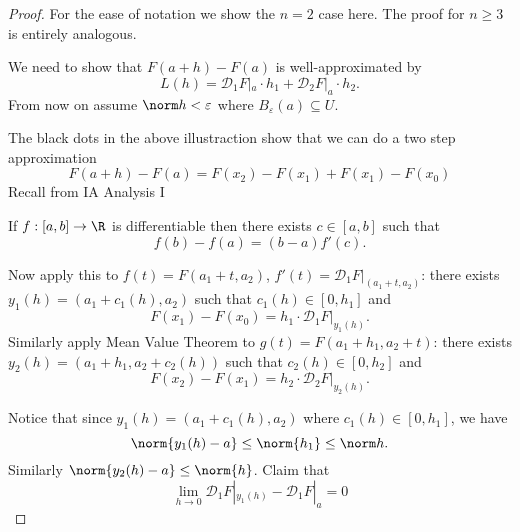 \documentclass[a4paper]{article}
\newcommand*{\D}{\mathcal{D}}
\theoremstyle{definition}
\begin{document}
\begin{proof}
  \label{proof:C1 implies differentiability}
  For the ease of notation we show the \(n = 2\) case here. The proof for \(n \geq 3\) is entirely analogous.

  We need to show that \(F(a + h) - F(a)\) is well-approximated by
  \[
    L(h) = \D_1 F|_a \cdot h_1 + \D_2 F|_a \cdot h_2.
  \]
  From now on assume \(\norm h < \varepsilon\) where \(B_\varepsilon(a) \subseteq U\).

  \begin{center}
  \end{center}
  The black dots in the above illustraction show that we can do a two step approximation
  \[
    F(a + h) - F(a) = F(x_2) - F(x_1) + F(x_1) - F(x_0)
  \]
  Recall from IA Analysis I
  
  \begin{theorem}
    If \(f: [a, b] \to \R\) is differentiable then there exists \(c \in [a, b]\) such that
    \[
      f(b) - f(a) = (b - a) f'(c).
    \]
  \end{theorem}

  Now apply this to \(f(t) = F(a_1 + t, a_2)\), \(f'(t) = \D_1 F|_{(a_1 + t, a_2)}\): there exists \(y_1(h) = (a_1 + c_1(h), a_2)\) such that \(c_1(h) \in [0, h_1]\) and
  \[
    F(x_1) - F(x_0) = h_1 \cdot \D_1 F|_{y_1(h)}.
  \]
  Similarly apply Mean Value Theorem to \(g(t) = F(a_1 + h_1, a_2 + t)\): there exists \(y_2(h) = (a_1 + h_1, a_2 + c_2(h))\) such that \(c_2(h) \in [0, h_2]\) and
  \[
    F(x_2) - F(x_1) = h_2 \cdot \D_2 F|_{y_2(h)}.
  \]

  Notice that since \(y_1(h) = (a_1 + c_1(h), a_2)\) where \(c_1(h) \in [0, h_1]\), we have
  \[
    \norm{y_1(h) - a} \leq \norm{h_1} \leq \norm h.
  \]
  Similarly \(\norm{y_2(h) - a} \leq \norm{h}\). Claim that
  \[
    \lim_{h \to 0} \D_1 F|_{y_1(h)} - \D_1 F|_a = 0
  \]


\end{proof}
\end{document}
